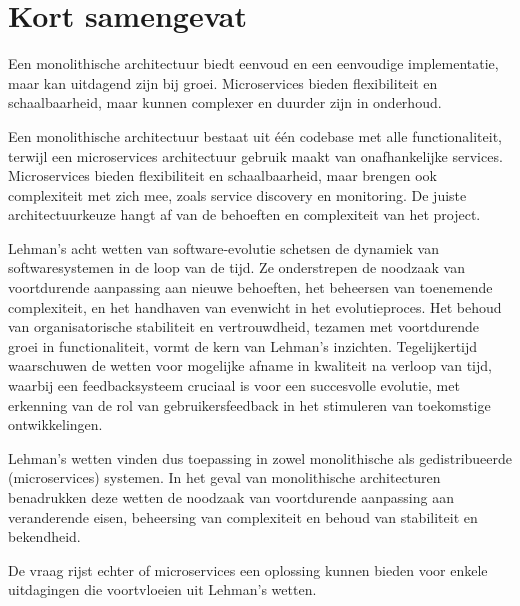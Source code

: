 \section{Kort samengevat}

Een monolithische architectuur biedt eenvoud en een eenvoudige implementatie, maar kan uitdagend zijn bij groei. Microservices bieden flexibiliteit en schaalbaarheid, maar kunnen complexer en duurder zijn in onderhoud.

Een monolithische architectuur bestaat uit één codebase met alle functionaliteit, terwijl een microservices architectuur gebruik maakt van onafhankelijke services. Microservices bieden flexibiliteit en schaalbaarheid, maar brengen ook complexiteit met zich mee, zoals service discovery en monitoring. De juiste architectuurkeuze hangt af van de behoeften en complexiteit van het project.

Lehman's acht wetten van software-evolutie schetsen de dynamiek van softwaresystemen in de loop van de tijd. Ze onderstrepen de noodzaak van voortdurende aanpassing aan nieuwe behoeften, het beheersen van toenemende complexiteit, en het handhaven van evenwicht in het evolutieproces. Het behoud van organisatorische stabiliteit en vertrouwdheid, tezamen met voortdurende groei in functionaliteit, vormt de kern van Lehman's inzichten. Tegelijkertijd waarschuwen de wetten voor mogelijke afname in kwaliteit na verloop van tijd, waarbij een feedbacksysteem cruciaal is voor een succesvolle evolutie, met erkenning van de rol van gebruikersfeedback in het stimuleren van toekomstige ontwikkelingen. 

Lehman's wetten vinden dus toepassing in zowel monolithische als gedistribueerde (microservices) systemen. In het geval van monolithische architecturen benadrukken deze wetten de noodzaak van voortdurende aanpassing aan veranderende eisen, beheersing van complexiteit en behoud van stabiliteit en bekendheid. 

De vraag rijst echter of microservices een oplossing kunnen bieden voor enkele uitdagingen die voortvloeien uit Lehman's wetten.

